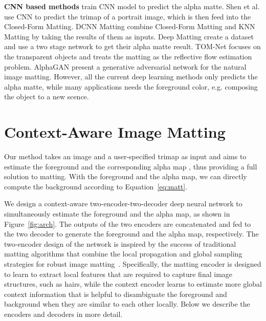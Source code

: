 \documentclass[10pt,twocolumn,letterpaper]{article}
\begin{document}
{\textbf{CNN based methods}\cite{chen2018tom, cho2016natural, cho2019deep, lutz2018alphagan, shen2016deep, xu2017deep} train CNN model to predict the alpha matte. Shen et al. \cite{shen2016deep} use CNN to predict the trimap of a portrait image, which is then feed into the Closed-Form Matting. DCNN Matting \cite{cho2016natural, cho2019deep} combine Closed-Form Matting and KNN Matting by taking the results of them as inputs. Deep Matting \cite{xu2017deep} create a dataset and use a two stage network to get their alpha matte result. TOM-Net\cite{chen2018tom} focuses on the transparent objects and treats the matting as the reflective flow estimation problem.  AlphaGAN \cite{lutz2018alphagan} present a generative adversarial network for the natural image matting. However, all the current deep learning methods only predicts the alpha matte, while many applications needs the foreground color, e.g. composing the object to a new scence.

} 
\section{Context-Aware Image Matting}
\label{sec:method}


Our method takes an image   and a user-specified trimap  as input and aims to estimate the foreground  and the corresponding alpha map  , thus providing a full solution to matting. With the foreground and the alpha map, we can directly compute the background according to Equation~\ref{eq:matt}.

We design a context-aware two-encoder-two-decoder deep neural network to simultaneously estimate the foreground and the alpha map, as shown in Figure~\ref{fig:arch}. The outputs of the two encoders are concatenated and fed to the two decoder to generate the foreground and the alpha map, respectively. The two-encoder design of the network is inspired by the success of traditional matting algorithms that combine the local propagation and global sampling strategies for robust image matting~\cite{aksoy2017designing, chen2013knn, he2011global, he2010fast}. Specifically, the matting encoder is designed to learn to extract local features that are required to capture final image structures, such as hairs, while the context encoder learns to estimate more global context information that is helpful to disambiguate the foreground and background when they are similar to each other locally. Below we describe the encoders and decoders in more detail.
\end{document}
